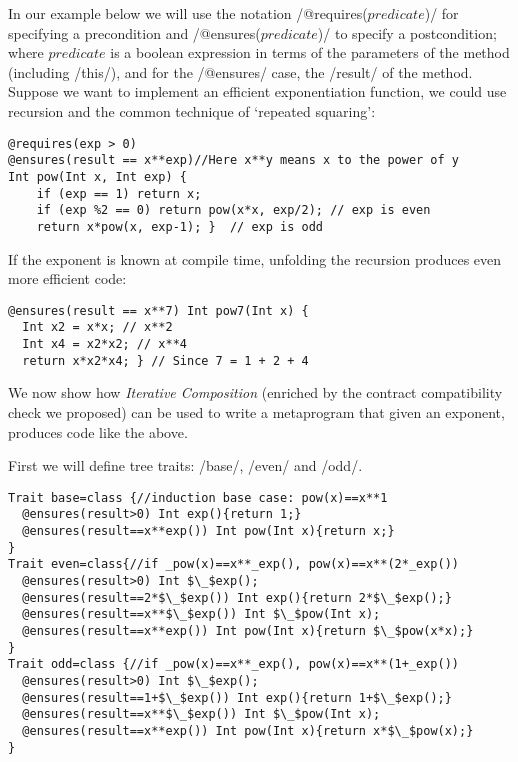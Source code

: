 In our example below we will use the notation /@requires($predicate$)/ 
for specifying a precondition and /@ensures($predicate$)/ 
to specify a postcondition; where $predicate$ is a boolean expression
in terms of the parameters of the method (including /this/), and for the /@ensures/ case, the /result/ of the method.
Suppose we want to implement an efficient exponentiation function, we could use recursion and the common technique of `repeated squaring':
\vspace{-1ex}
\begin{lstlisting}
@requires(exp > 0)
@ensures(result == x**exp)//Here x**y means x to the power of y
Int pow(Int x, Int exp) {
	if (exp == 1) return x;
	if (exp %2 == 0) return pow(x*x, exp/2); // exp is even
	return x*pow(x, exp-1); }  // exp is odd
\end{lstlisting}
If the exponent is known at compile time,
unfolding the recursion produces even more efficient code:
\vspace{-1ex}
\begin{lstlisting}
@ensures(result == x**7) Int pow7(Int x) { 
  Int x2 = x*x; // x**2
  Int x4 = x2*x2; // x**4
  return x*x2*x4; } // Since 7 = 1 + 2 + 4
\end{lstlisting}
\vspace{-1ex}

We now show how \emph{Iterative Composition} %
(enriched by the contract compatibility check we proposed) %
can be used to write a metaprogram that given an exponent, produces code like the above.
 
First we will define tree traits: /base/, /even/ and /odd/.
\begin{lstlisting}
Trait base=class {//induction base case: pow(x)==x**1
  @ensures(result>0) Int exp(){return 1;}  
  @ensures(result==x**exp()) Int pow(Int x){return x;}
}
Trait even=class{//if _pow(x)==x**_exp(), pow(x)==x**(2*_exp())
  @ensures(result>0) Int $\_$exp();
  @ensures(result==2*$\_$exp()) Int exp(){return 2*$\_$exp();}
  @ensures(result==x**$\_$exp()) Int $\_$pow(Int x);
  @ensures(result==x**exp()) Int pow(Int x){return $\_$pow(x*x);}
}
Trait odd=class {//if _pow(x)==x**_exp(), pow(x)==x**(1+_exp())
  @ensures(result>0) Int $\_$exp();
  @ensures(result==1+$\_$exp()) Int exp(){return 1+$\_$exp();}
  @ensures(result==x**$\_$exp()) Int $\_$pow(Int x);
  @ensures(result==x**exp()) Int pow(Int x){return x*$\_$pow(x);}
}
\end{lstlisting}

